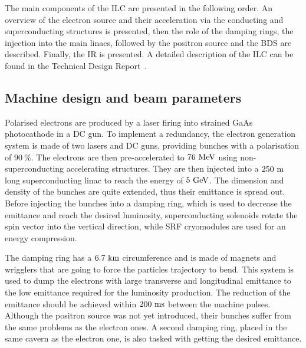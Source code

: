     The main components of the \gls{ILC} are presented in the following order.
    An overview of the electron source and their acceleration via the conducting and superconducting structures is presented, then the role of the damping rings, the injection into the main linacs, followed by the positron source and the \gls{BDS} are described.
    Finally, the \gls{IR} is presented.
    A detailed description of the \gls{ILC} can be found in the Technical Design Report~\cite{Appleby2006}.

    \subsection{Machine design and beam parameters}
    \label{subsec:design}

    Polarised electrons are produced by a laser firing into strained GaAs photocathode in a \gls{DC} gun.
    To implement a redundancy, the electron generation system is made of two lasers and \gls{DC} guns, providing bunches with a polarisation of $90~\%$.
    The electrons are then pre-accelerated to $76~\rm{MeV}$ using non-superconducting accelerating structures.
    They are then injected into a $250~\rm{m}$ long superconducting linac to reach the energy of $5~\rm{GeV}$.
    The dimension and density of the bunches are quite extended, thus their emittance is spread out.
    Before injecting the bunches into a damping ring, which is used to decrease the emittance and reach the desired luminosity, superconducting solenoids rotate the spin vector into the vertical direction, while \gls{SRF} cryomodules are used for an energy compression.
 
    The damping ring has a $6.7~\rm{km}$ circumference and is made of magnets and wrigglers that are going to force the particles trajectory to bend.
    This system is used to dump the electrons with large transverse and longitudinal emittance to the low emittance required for the luminosity production.
    The reduction of the emittance should be achieved within $200~\rm{ms}$ between the machine pulses.
    Although the positron source was not yet introduced, their bunches suffer from the same problems as the electron ones. 
    A second damping ring, placed in the same cavern as the electron one, is also tasked with getting the desired emittance.

